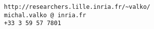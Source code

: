 \renewcommand{\categoryfont}{\sc}

\def\Cplusplus{{\rm C\raise.5ex\hbox{\small ++}}}

%
% 
\setlength{\oddsidemargin}{1in}
\setlength{\marginparwidth}{1in}
% 
%
\addtolength{\marginparwidth}{-\marginparsep}
 \setlength{\evensidemargin}{\oddsidemargin}
 \setlength{\textwidth}{\paperwidth}
 \addtolength{\textwidth}{-2in}
 \addtolength{\textwidth}{-2\oddsidemargin}
 \addtolength{\textwidth}{\marginparwidth}
 \addtolength{\textwidth}{\marginparsep}
%
%
\setlength{\topmargin}{-0.5in}
%
%
\renewcommand{\labelcitem}{$\diamond$}
\renewcommand{\labelitemi}{$\cdot$}
\newcommand{\first}{$1^{\mbox{\scriptsize st}}$\ }
\newcommand{\second}{$2^{\mbox{\scriptsize nd}}$\ }
\newcommand{\third}{$3^{\mbox{\scriptsize rd}}$\ }
\newcommand{\fourth}{$4^{\mbox{\scriptsize th}}$\ }
\newcommand{\fifth}{$5^{\mbox{\scriptsize th}}$\ }
\newcommand{\sixth}{$6^{\mbox{\scriptsize th}}$\ }
\newcommand{\nineth}{$9^{\mbox{\scriptsize th}}$\ }
\newcommand{\comment}[1]{}


\author{Michal Valko}

\address{Meta Paris, GenAI, Llama team\\
	6 Rue M\'enars\\
	75009 Paris, France\\		
	}{
	\mbox{\small\tt http://researchers.lille.inria.fr/\~{}valko/}\\
	\mbox{\small\tt michal.valko\,@\,inria.fr}\\
	\mbox{\small\tt +33 3 59 57 7801}\\
}
